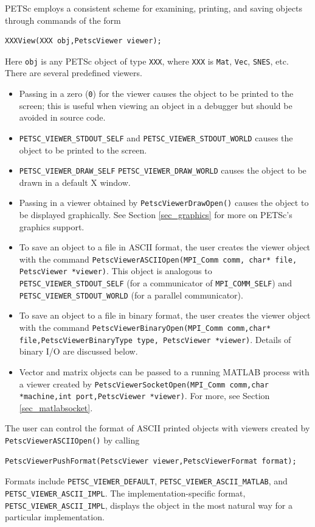 {{{PETSc employs a consistent scheme for examining, printing, and
saving objects through commands of the form
\begin{lstlisting}
XXXView(XXX obj,PetscViewer viewer);
\end{lstlisting}
Here \lstinline{obj} is any PETSc object of type
\lstinline{XXX},  where \lstinline{XXX}
is \lstinline{Mat}, \lstinline{Vec}, \lstinline{SNES}, etc. There are several
predefined viewers.
\begin{itemize}
  \item Passing in a zero (\lstinline{0}) for the viewer causes the object to be printed
      to the screen; this is useful when viewing an object in
      a debugger but should be avoided in source code.
    \item \lstinline{PETSC_VIEWER_STDOUT_SELF} and
      \lstinline{PETSC_VIEWER_STDOUT_WORLD}
      causes the object to be printed to the screen.
    \item \lstinline{PETSC_VIEWER_DRAW_SELF}
      \lstinline{PETSC_VIEWER_DRAW_WORLD} causes the
      object to be drawn in a default X window. 
\item Passing in a viewer obtained by
      \lstinline{PetscViewerDrawOpen()} causes the object to be displayed graphically.
      See Section \ref{sec_graphics} for more on PETSc's graphics support.
\item To save an object to a file in ASCII format, the user creates
      the viewer object with the command
      \lstinline{PetscViewerASCIIOpen(MPI_Comm comm, char* file, PetscViewer *viewer)}.
      This object is
      analogous to \lstinline{PETSC_VIEWER_STDOUT_SELF} (for a communicator of
      \lstinline{MPI_COMM_SELF}) and
      \lstinline{PETSC_VIEWER_STDOUT_WORLD} (for a parallel communicator).
\item To save an object to a file in binary format, the user creates
      the viewer object with the command
      \lstinline{PetscViewerBinaryOpen(MPI_Comm comm,char* file,PetscViewerBinaryType type, PetscViewer *viewer)}. Details of binary
      I/O are discussed below.
\item Vector and matrix objects can be passed to a running MATLAB process
      with a viewer created by
    \lstinline{PetscViewerSocketOpen(MPI_Comm comm,char *machine,int port,PetscViewer *viewer)}.
    For more, see Section \ref{sec_matlabsocket}.
\end{itemize}

The user can control the format of ASCII printed objects with viewers
created by \break\lstinline{PetscViewerASCIIOpen()} by calling
\begin{lstlisting}
PetscViewerPushFormat(PetscViewer viewer,PetscViewerFormat format);
\end{lstlisting}
 
Formats include
\lstinline{PETSC_VIEWER_DEFAULT}, \lstinline{PETSC_VIEWER_ASCII_MATLAB}, and
\lstinline{PETSC_VIEWER_ASCII_IMPL}.  The implementation-specific format,
\lstinline{PETSC_VIEWER_ASCII_IMPL}, displays the object in the most natural way
for a particular implementation.

}}}
